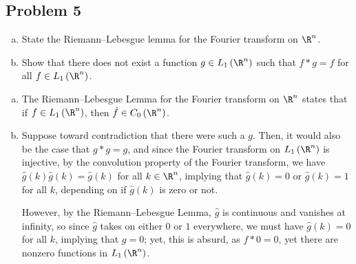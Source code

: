 \documentclass[10pt]{mypackage}
\begin{document}
\subsection{Problem 5}%
\begin{problem}\hfill
  \begin{enumerate}[(a)]
    \item State the Riemann--Lebesgue lemma for the Fourier transform on $\R^n$.
    \item Show that there does not exist a function $g\in L_1\left( \R^n \right)$ such that $f\ast g = f$ for all $f\in L_1\left( \R^n \right)$.
  \end{enumerate}
\end{problem}
\begin{enumerate}[(a)]
  \item The Riemann--Lebesgue Lemma for the Fourier transform on $\R^n$ states that if $f\in L_1\left( \R^n \right)$, then $\hat{f}\in C_0\left( \R^n \right)$.
  \item Suppose toward contradiction that there were such a $g$. Then, it would also be the case that $g\ast g = g$, and since the Fourier transform on $L_1\left( \R^n \right)$ is injective, by the convolution property of the Fourier transform, we have $\hat{g}(k)\hat{g}(k) = \hat{g}(k)$ for all $k\in \R^n$, implying that $\hat{g}(k) = 0$ or $\hat{g}(k) = 1$ for all $k$, depending on if $\hat{g}(k)$ is zero or not.\newline

    However, by the Riemann--Lebesgue Lemma, $\hat{g}$ is continuous and vanishes at infinity, so since $\hat{g}$ takes on either $0$ or $1$ everywhere, we must have $\hat{g}(k) = 0$ for all $k$, implying that $g = 0$; yet, this is absurd, as $f\ast 0 = 0$, yet there are nonzero functions in $L_1\left( \R^n \right)$.
\end{enumerate}
\end{document}
